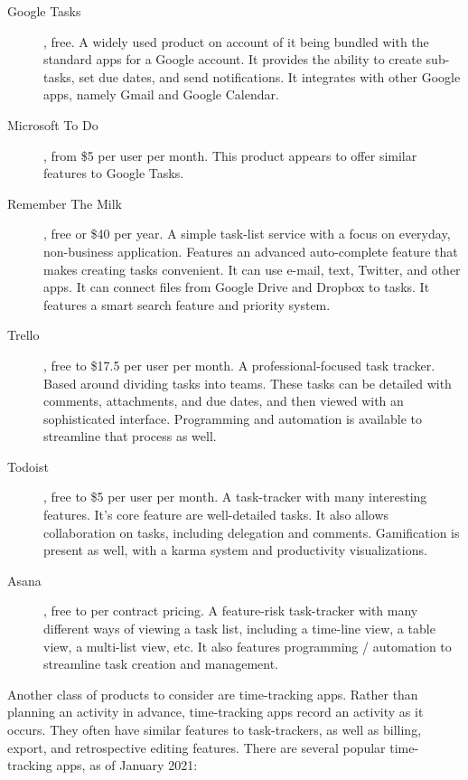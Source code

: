 \documentclass{article}
\begin{document}
\begin{description}
    \item[Google Tasks], free.
    A widely used product on account of it being bundled with the standard apps for a Google account.
    It provides the ability to create sub-tasks, set due dates, and send notifications.
    It integrates with other Google apps, namely Gmail and Google Calendar.
    \item[Microsoft To Do], from \$5 per user per month.
    This product appears to offer similar features to Google Tasks.
    \item[Remember The Milk], free or \$40 per year.
    A simple task-list service with a focus on everyday, non-business application.
    Features an advanced auto-complete feature that makes creating tasks convenient.
    It can use e-mail, text, Twitter, and other apps.
    It can connect files from Google Drive and Dropbox to tasks.
    It features a smart search feature and priority system.
    \item[Trello], free to \$17.5 per user per month.
    A professional-focused task tracker.
    Based around dividing tasks into teams.
    These tasks can be detailed with comments, attachments, and due dates, and then viewed with an sophisticated interface.
    Programming and automation is available to streamline that process as well.
    \item[Todoist], free to \$5 per user per month.
    A task-tracker with many interesting features.
    It's core feature are well-detailed tasks.
    It also allows collaboration on tasks, including delegation and comments.
    Gamification is present as well, with a karma system and productivity visualizations.
    \item[Asana], free to per contract pricing.
    A feature-risk task-tracker with many different ways of viewing a task list, including a time-line view, a table view, a multi-list view, etc.
    It also features programming / automation to streamline task creation and management.
\end{description}

Another class of products to consider are time-tracking apps.
Rather than planning an activity in advance, time-tracking apps record an activity as it occurs.
They often have similar features to task-trackers, as well as billing, export, and retrospective editing features.
There are several popular time-tracking apps, as of January 2021:
\end{document}
